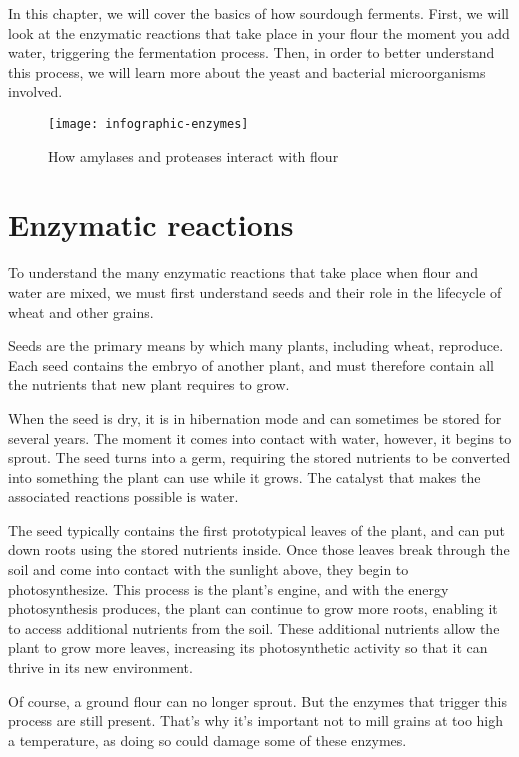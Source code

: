 In this chapter, we will cover the basics of how sourdough ferments.
First, we will look at the enzymatic reactions that take place
in your flour the moment you add water, triggering the fermentation
process. Then, in order to better understand this process, we will
learn more about the yeast and bacterial microorganisms involved.

\begin{figure}[!htb]
  \texttt{[image: infographic-enzymes]}
  \caption{How amylases and proteases interact with flour}
  \label{infographic-enzymes}
\end{figure}

\section{Enzymatic reactions}

To understand the many enzymatic reactions that take place when flour
and water are mixed, we must first understand seeds and their role in
the lifecycle of wheat and other grains.

Seeds are the primary means by which many plants, including wheat,
reproduce. Each seed contains the embryo of another plant, and must
therefore contain all the nutrients that new plant requires to grow.

When the seed is dry, it is in hibernation mode and can sometimes be
stored for several years. The moment it comes into contact with water,
however, it begins to sprout. The seed turns into a germ, requiring the
stored nutrients to be converted into something the plant can use while
it grows. The catalyst that makes the associated reactions possible is water.

The seed typically contains the first prototypical leaves of the plant,
and can put down roots using the stored nutrients inside. Once those leaves
break through the soil and come into contact with the sunlight above, they
begin to photosynthesize. This process is the plant's engine, and with the
energy photosynthesis produces, the plant can continue to grow more roots,
enabling it to access additional nutrients from the soil. These additional
nutrients allow the plant to grow more leaves, increasing its photosynthetic
activity so that it can thrive in its new environment.

Of course, a ground flour can no longer sprout. But the enzymes that
trigger this process are still present. That's why it's important not to
mill grains at too high a temperature, as doing so could damage some of
these enzymes.

